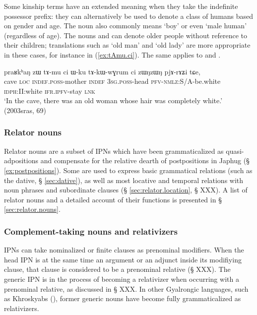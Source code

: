 Some kinship terms have an extended meaning when they take the indefinite possessor prefix: they can alternatively be used to denote a class of humans based on gender and age. The noun  also commonly means `boy' or even `male human' (regardless of age). The nouns  and  can denote older people without reference to their children; translations such as `old man' and `old lady' are more appropriate in these cases, for instance in (\ref{ex:tAmu.ci}). The same applies to   and .


\begin{exe}
\ex \label{ex:tAmu.ci}
\gll praʁkʰaŋ  zɯ tɤ-mu ci ɯ-ku tɤ-kɯ-wɣrum ci zɯŋzɯŋ pjɤ-rɤʑi tɕe, \\
cave \textsc{loc} \textsc{indef.poss}-mother \textsc{indef} \textsc{3sg}.\textsc{poss}-head \textsc{pfv}-\textsc{nmlz}:S/A-be.white \textsc{idph}:II:white \textsc{ifr}.\textsc{ipfv}-stay \textsc{lnk} \\
\glt `In the cave, there was an old woman whose hair was completely white.' (2003sras, 69)
\end{exe}

\subsubsection{Relator nouns}
Relator nouns are a subset of IPNs which have been grammaticalized as quasi-adpositions and compensate for the relative dearth of postpositions in Japhug  (§ \ref{ex:postpositions}). Some are used to express basic grammatical relations (such as the dative, § \ref{sec:dative}), as well as most locative and temporal relations with noun phrases  and subordinate clauses (§ \ref{sec:relator.location}, § XXX).  A list of relator nouns and a detailed account of their functions is presented in § \ref{sec:relator.nouns}.

\subsubsection{Complement-taking nouns and relativizers}
IPNs can take nominalized or finite clauses as prenominal modifiers. When the head IPN is at the same time an argument or an adjunct inside its modifiying clause, that clause is considered to be a prenominal relative (§ XXX). The generic IPN  is in the process of becoming a relativizer when occurring with a prenominal relative, as discussed in § XXX. In other Gyalrongic languages, such as Khroskyabs (\citealt[519]{lai17khroskyabs}), former generic nouns have become fully grammaticalized as relativizers.


